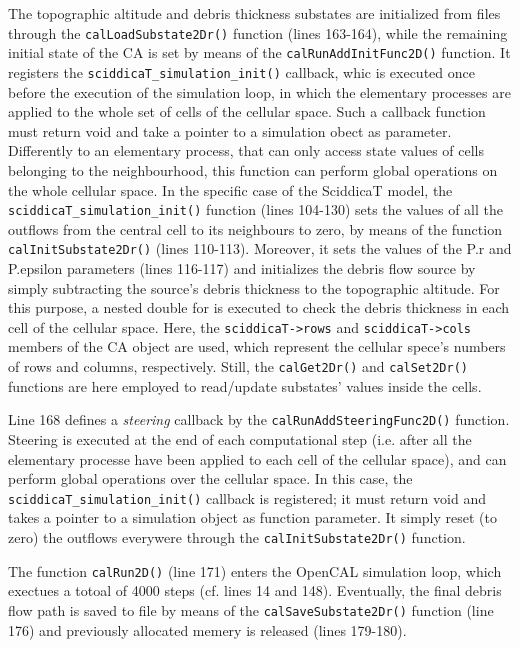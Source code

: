 The topographic altitude and debris thickness substates are
initialized from files through the \verb'calLoadSubstate2Dr()'
function (lines 163-164), while the remaining initial state of the CA
is set by means of the \verb'calRunAddInitFunc2D()' function. It
registers the \verb'sciddicaT_simulation_init()' callback, whic is
executed once before the execution of the simulation loop, in which
the elementary processes are applied to the whole set of cells of the
cellular space. Such a callback function must return void and take a
pointer to a simulation obect as parameter. Differently to an
elementary process, that can only access state values of cells
belonging to the neighbourhood, this function can perform global
operations on the whole cellular space. In the specific case of the
SciddicaT model, the \verb'sciddicaT_simulation_init()' function
(lines 104-130) sets the values of all the outflows from the central
cell to its neighbours to zero, by means of the function
\verb'calInitSubstate2Dr()' (lines 110-113). Moreover, it sets the
values of the P.r and P.epsilon parameters (lines 116-117) and
initializes the debris flow source by simply subtracting the source's
debris thickness to the topographic altitude. For this purpose, a
nested double for is executed to check the debris thickness in each
cell of the cellular space. Here, the \verb'sciddicaT->rows' and
\verb'sciddicaT->cols' members of the CA object are used, which
represent the cellular spece's numbers of rows and columns,
respectively. Still, the \verb'calGet2Dr()' and \verb'calSet2Dr()'
functions are here employed to read/update substates' values inside
the cells.

Line 168 defines a \emph{steering} callback by
the \verb'calRunAddSteeringFunc2D()' function. Steering is executed at
the end of each computational step (i.e. after all the elementary
processe have been applied to each cell of the cellular space), and
can perform global operations over the cellular space. In this case,
the \verb'sciddicaT_simulation_init()' callback is registered; it must
return void and takes a pointer to a simulation object as function
parameter. It simply reset (to zero) the outflows everywere through
the \verb'calInitSubstate2Dr()' function.

The function \verb'calRun2D()' (line 171) enters the OpenCAL
simulation loop, which exectues a totoal of 4000 steps (cf. lines 14
and 148). Eventually, the final debris flow path is saved to file by
means of the \verb'calSaveSubstate2Dr()' function (line 176) and
previously allocated memery is released (lines 179-180).

